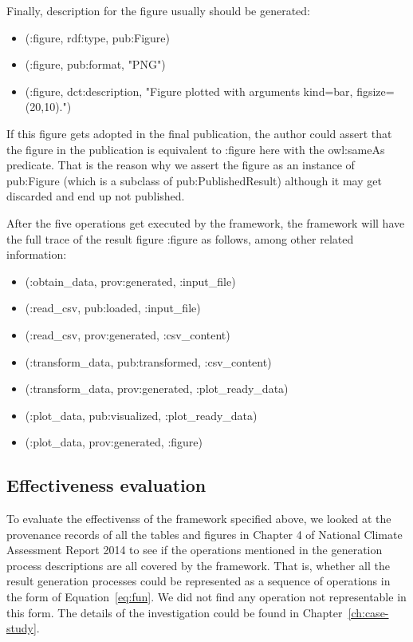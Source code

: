Finally, description for the figure usually should be generated:
\begin{itemize}
	\item (:figure, rdf:type, pub:Figure)
	\item (:figure, pub:format, "PNG")
	\item (:figure, dct:description, "Figure plotted with arguments kind=bar, figsize=(20,10).")
\end{itemize}
If this figure gets adopted in the final publication, the author could assert that the figure in the publication is equivalent to :figure here with the owl:sameAs predicate. That is the reason why we assert the figure as an instance of pub:Figure (which is a subclass of pub:PublishedResult) although it may get discarded and end up not published.

After the five operations get executed by the framework, the framework will have the full trace of the result figure :figure as follows, among other related information:
\begin{itemize}
	\item (:obtain\_data, prov:generated, :input\_file)
	\item (:read\_csv, pub:loaded, :input\_file)
	\item (:read\_csv, prov:generated, :csv\_content)
	\item (:transform\_data, pub:transformed, :csv\_content)
	\item (:transform\_data, prov:generated, :plot\_ready\_data)
	\item (:plot\_data, pub:visualized, :plot\_ready\_data)
	\item (:plot\_data, prov:generated, :figure)
\end{itemize}

\subsection{Effectiveness evaluation}
To evaluate the effectivenss of the framework specified above, we looked at the provenance records of all the tables and figures in Chapter 4 of National Climate Assessment Report 2014 to see if the operations mentioned in the generation process descriptions are all covered by the framework. That is, whether all the result generation processes could be represented as a sequence of operations in the form of Equation~\ref{eq:fun}. We did not find any operation not representable in this form. The details of the investigation could be found in Chapter~\ref{ch:case-study}.

